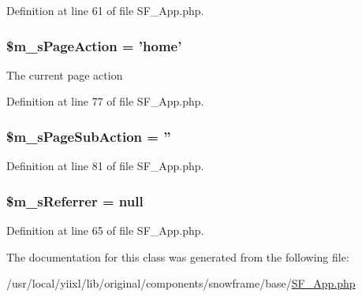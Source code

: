 Definition at line 61 of file SF\_\-App.php.

\hypertarget{classSF__App_a82cc1f3844569fa451cac5abc03b1a4d}{
\subsubsection[{\$m\_\-sPageAction}]{\setlength{\rightskip}{0pt plus 5cm}\$m\_\-sPageAction = 'home'}}
\label{classSF__App_a82cc1f3844569fa451cac5abc03b1a4d}
The current page action 

Definition at line 77 of file SF\_\-App.php.

\hypertarget{classSF__App_a980e6fd9e83172281b1e6dac50f16e9c}{
\subsubsection[{\$m\_\-sPageSubAction}]{\setlength{\rightskip}{0pt plus 5cm}\$m\_\-sPageSubAction = ''}}
\label{classSF__App_a980e6fd9e83172281b1e6dac50f16e9c}


Definition at line 81 of file SF\_\-App.php.

\hypertarget{classSF__App_a251ed856d45aa28d717a012291b71d26}{
\subsubsection[{\$m\_\-sReferrer}]{\setlength{\rightskip}{0pt plus 5cm}\$m\_\-sReferrer = null}}
\label{classSF__App_a251ed856d45aa28d717a012291b71d26}


Definition at line 65 of file SF\_\-App.php.



The documentation for this class was generated from the following file:\begin{DoxyCompactItemize}
\item 
/usr/local/yiixl/lib/original/components/snowframe/base/\hyperlink{SF__App_8php}{SF\_\-App.php}\end{DoxyCompactItemize}
